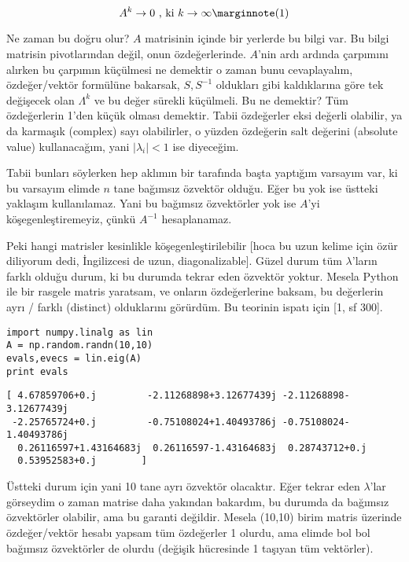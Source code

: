 \documentclass[12pt,fleqn]{article}\usepackage{../../common}
\begin{document}
$$
A^k \to 0 \textrm{ , ki } k \to \infty  
\mlabel{1}
$$ 

Ne zaman bu doğru olur? $A$ matrisinin içinde bir yerlerde bu bilgi var. Bu
bilgi matrisin pivotlarından değil, onun özdeğerlerinde. $A$'nin ardı
ardında çarpımını alırken bu çarpımın küçülmesi ne demektir o zaman bunu
cevaplayalım, özdeğer/vektör formülüne bakarsak, $S,S^{-1}$ oldukları gibi
kaldıklarına göre tek değişecek olan $\Lambda^k$ ve bu değer sürekli
küçülmeli. Bu ne demektir? Tüm özdeğerlerin 1'den küçük olması
demektir. Tabii özdeğerler eksi değerli olabilir, ya da karmaşık (complex)
sayı olabilirler, o yüzden özdeğerin salt değerini (absolute value)
kullanacağım, yani $|\lambda_i| < 1$ ise diyeceğim. 

Tabii bunları söylerken hep aklımın bir tarafında başta yaptığım varsayım
var, ki bu varsayım elimde $n$ tane bağımsız özvektör olduğu. Eğer bu yok
ise üstteki yaklaşım kullanılamaz. Yani bu bağımsız özvektörler yok ise
$A$'yi köşegenleştiremeyiz, çünkü $A^{-1}$ hesaplanamaz.

Peki hangi matrisler kesinlikle köşegenleştirilebilir [hoca bu uzun kelime
için özür diliyorum dedi, İngilizcesi de uzun, diagonalizable]. Güzel durum
tüm $\lambda$'ların farklı olduğu durum, ki bu durumda tekrar eden özvektör
yoktur. Mesela Python ile bir rasgele matris yaratsam, ve onların
özdeğerlerine baksam, bu değerlerin ayrı / farklı (distinct) olduklarını
görürdüm. Bu teorinin ispatı için [1, sf 300]. 

\begin{verbatim}
import numpy.linalg as lin
A = np.random.randn(10,10)
evals,evecs = lin.eig(A)
print evals
\end{verbatim}

\begin{verbatim}
[ 4.67859706+0.j         -2.11268898+3.12677439j -2.11268898-3.12677439j
 -2.25765724+0.j         -0.75108024+1.40493786j -0.75108024-1.40493786j
  0.26116597+1.43164683j  0.26116597-1.43164683j  0.28743712+0.j
  0.53952583+0.j        ]
\end{verbatim}

Üstteki durum için yani 10 tane ayrı özvektör olacaktır. Eğer tekrar eden
$\lambda$'lar görseydim o zaman matrise daha yakından bakardım, bu durumda
da bağımsız özvektörler olabilir, ama bu garanti değildir. Mesela (10,10)
birim matris üzerinde özdeğer/vektör hesabı yapsam tüm özdeğerler 1 olurdu,
ama elimde bol bol bağımsız özvektörler de olurdu (değişik hücresinde 1
taşıyan tüm vektörler).
\end{document}
